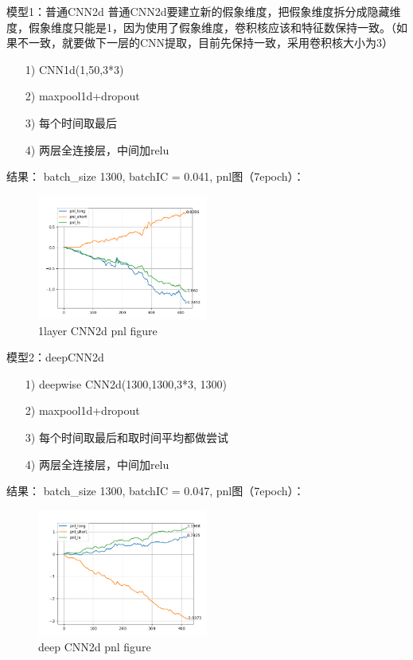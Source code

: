 \documentclass[11pt]{ctexart}
\begin{document}
模型1：普通CNN2d
普通CNN2d要建立新的假象维度，把假象维度拆分成隐藏维度，假象维度只能是1，因为使用了假象维度，卷积核应该和特征数保持一致。（如果不一致，就要做下一层的CNN提取，目前先保持一致，采用卷积核大小为3）
\begin{itemize}
  \item [1)]
  CNN1d(1,50,3*3)
  \item [2)]
  maxpool1d+dropout
  \item [3)]
  每个时间取最后
  \item [4)]
  两层全连接层，中间加relu

\end{itemize}
结果： batch\_size 1300, batchIC = 0.041,
pnl图（7epoch）：
\begin{figure}[h!]
\begin{center}
\includegraphics[width=0.5\textwidth]{1.PNG}
\end{center}
\caption{1layer CNN2d pnl figure}
\label{FIG.2}
\end{figure}

模型2：deepCNN2d
\begin{itemize}
  \item [1)]
  deepwise CNN2d(1300,1300,3*3, 1300)
  \item [2)]
  maxpool1d+dropout
  \item [3)]
  每个时间取最后和取时间平均都做尝试
  \item [4)]
  两层全连接层，中间加relu

\end{itemize}
结果： batch\_size 1300, batchIC = 0.047,
pnl图（7epoch）：
\begin{figure}[h!]
\begin{center}
\includegraphics[width=0.5\textwidth]{4.PNG}
\end{center}
\caption{deep CNN2d pnl figure}
\label{FIG.3}
\end{figure}
\end{document}
